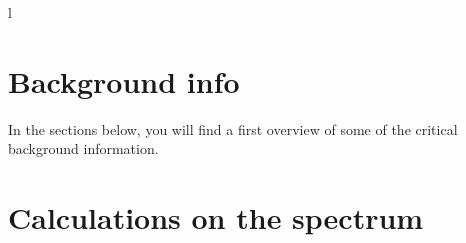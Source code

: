 \documentclass[12pt,a4paper]{article}
\numberwithin{equation}{section}
\numberwithin{figure}{section}
\numberwithin{table}{section}
\begin{document}
l\section{Background info}
In the sections below, you will find a first overview of some of the critical background information.






\newpage 
\section{Calculations on the spectrum} %
\label{sec:calculations_on_the_spectrum}




\vspace{2cm}
%
%
\printbibliography
%
%
%

\appendix

\end{document}
